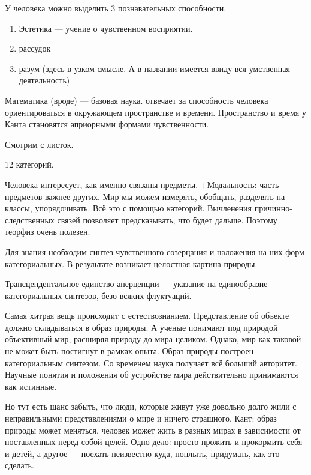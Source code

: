 У человека можно выделить 3 познавательных способности. 
\begin{enumerate}
	\item Эстетика --- учение о чувственном восприятии.
	\item рассудок
	\item разум (здесь в узком смысле. А в названии имеется ввиду вся умственная деятельность)
\end{enumerate}

Математика (вроде) --- базовая наука. отвечает за способность человека ориентироваться в окружающем пространстве и времени. 
Пространство и время у Канта становятся априорными формами чувственности.

Смотрим с листок.

12 категорий.

Человека интересует, как именно связаны предметы. +Модальность: часть предметов важнее других. Мир мы можем измерять, обобщать, разделять на классы, упорядочивать. Всё это с помощью категорий. 
Вычленения причинно-следственных связей позволяет предсказывать, что будет дальше. Поэтому теорфиз очень полезен.

Для знания необходим синтез чувственного созерцания и наложения на них форм категориальных. В результате возникает целостная картина природы. 

Трансцендентальное единство аперцепции --- указание на единообразие категориальных синтезов, безо всяких флуктуаций.

Самая хитрая вещь происходит с естествознанием. Представление об объекте должно складываться в образ природы. А ученые понимают под природой объективный мир, расширяя природу до мира целиком. 
Однако, мир как таковой не может быть постигнут в рамках опыта. Образ природы построен категориальным синтезом. Со временем наука получает всё больший авторитет. Научные понятия и положения об устройстве мира действительно принимаются как истинные. 

Но тут есть шанс забыть, что люди, которые живут уже довольно долго жили с неправильными представлениями о мире и ничего страшного.
Кант: образ природы может меняться, человек может жить в разных мирах в зависимости от поставленных перед собой целей. Одно дело: просто прожить и прокормить себя и детей, а другое --- поехать неизвестно куда, поплыть, придумать, как это сделать.